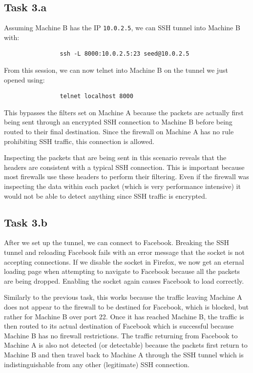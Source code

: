 \documentclass[12pt,letterpaper]{article}
\begin{document}
		\subsection*{Task 3.a}
			Assuming Machine B has the IP \texttt{10.0.2.5}, we can SSH tunnel into Machine B with:
			
			\begin{verbatim}
				ssh -L 8000:10.0.2.5:23 seed@10.0.2.5
			\end{verbatim}
			
			From this session, we can now telnet into Machine B on the tunnel we just opened using:
			
			\begin{verbatim}
				telnet localhost 8000
			\end{verbatim}
			
			This bypasses the filters set on Machine A because the packets are actually first being sent through an encrypted SSH connection to Machine B before being routed to their final destination. Since the firewall on Machine A has no rule prohibiting SSH traffic, this connection is allowed.
			
			Inspecting the packets that are being sent in this scenario reveals that the headers are consistent with a typical SSH connection. This is important because most firewalls use these headers to perform their filtering. Even if the firewall was inspecting the data within each packet (which is very performance intensive) it would not be able to detect anything since SSH traffic is encrypted.
			
		\subsection*{Task 3.b}
			After we set up the tunnel, we can connect to Facebook. Breaking the SSH tunnel and reloading Facebook fails with an error message that the socket is not accepting connections. If we disable the socket in Firefox, we now get an eternal loading page when attempting to navigate to Facebook because all the packets are being dropped. Enabling the socket again causes Facebook to load correctly.
			
			Similarly to the previous task, this works because the traffic leaving Machine A does not appear to the firewall to be destined for Facebook, which is blocked, but rather for Machine B over port 22. Once it has reached Machine B, the traffic is then routed to its actual destination of Facebook which is successful because Machine B has no firewall restrictions. The traffic returning from Facebook to Machine A is also not detected (or detectable) because the packets first return to Machine B and then travel back to Machine A through the SSH tunnel which is indistinguishable from any other (legitimate) SSH connection.
			
\end{document}

